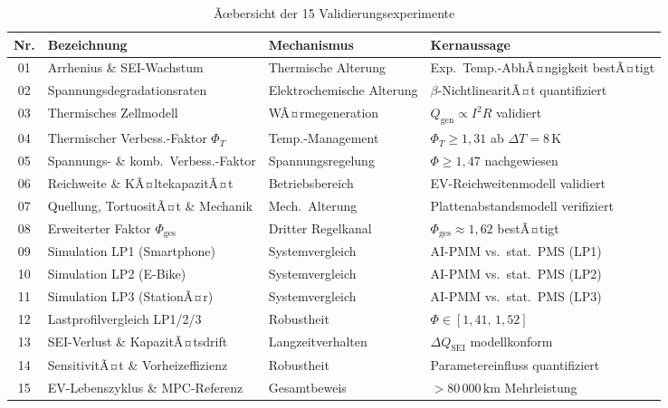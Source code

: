 ﻿\documentclass[12pt,a4paper]{article}
\begin{document}
	\begin{table}
		\centering
		\caption{Ãœbersicht der 15 Validierungsexperimente}
		\label{tab:exp_overview}
		\small
		\begin{tabular}{clll}
			\toprule
			\textbf{Nr.} & \textbf{Bezeichnung} & \textbf{Mechanismus} & \textbf{Kernaussage} \\
			\midrule
			01 & Arrhenius \& SEI-Wachstum & Thermische Alterung & Exp.\ Temp.-AbhÃ¤ngigkeit bestÃ¤tigt \\
			02 & Spannungsdegradationsraten & Elektrochemische Alterung & $\beta$-NichtlinearitÃ¤t quantifiziert \\
			03 & Thermisches Zellmodell & WÃ¤rmegeneration & $Q_\mathrm{gen} \propto I^2 R$ validiert \\
			04 & Thermischer Verbess.-Faktor $\Phi_T$ & Temp.-Management & $\Phi_T \geq 1{,}31$ ab $\Delta T=8\,\mathrm{K}$ \\
			05 & Spannungs- \& komb.\ Verbess.-Faktor & Spannungsregelung & $\Phi \geq 1{,}47$ nachgewiesen \\
			06 & Reichweite \& KÃ¤ltekapazitÃ¤t & Betriebsbereich & EV-Reichweitenmodell validiert \\
			07 & Quellung, TortuositÃ¤t \& Mechanik & Mech.\ Alterung & Plattenabstandsmodell verifiziert \\
			08 & Erweiterter Faktor $\Phi_\mathrm{ges}$ & Dritter Regelkanal & $\Phi_\mathrm{ges} \approx 1{,}62$ bestÃ¤tigt \\
			09 & Simulation LP1 (Smartphone) & Systemvergleich & AI-PMM vs.\ stat.\ PMS (LP1) \\
			10 & Simulation LP2 (E-Bike) & Systemvergleich & AI-PMM vs.\ stat.\ PMS (LP2) \\
			11 & Simulation LP3 (StationÃ¤r) & Systemvergleich & AI-PMM vs.\ stat.\ PMS (LP3) \\
			12 & Lastprofilvergleich LP1/2/3 & Robustheit & $\Phi \in [1{,}41,\, 1{,}52]$ \\
			13 & SEI-Verlust \& KapazitÃ¤tsdrift & Langzeitverhalten & $\Delta Q_\mathrm{SEI}$ modellkonform \\
			14 & SensitivitÃ¤t \& Vorheizeffizienz & Robustheit & Parametereinfluss quantifiziert \\
			15 & EV-Lebenszyklus \& MPC-Referenz & Gesamtbeweis & $> 80\,000\,\mathrm{km}$ Mehrleistung \\
			\bottomrule
		\end{tabular}
	\end{table}
\end{document}
